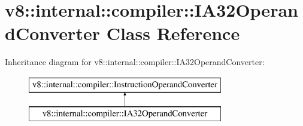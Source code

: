\hypertarget{classv8_1_1internal_1_1compiler_1_1_i_a32_operand_converter}{}\section{v8\+:\+:internal\+:\+:compiler\+:\+:I\+A32\+Operand\+Converter Class Reference}
\label{classv8_1_1internal_1_1compiler_1_1_i_a32_operand_converter}
Inheritance diagram for v8\+:\+:internal\+:\+:compiler\+:\+:I\+A32\+Operand\+Converter\+:\begin{figure}[H]
\begin{center}
\leavevmode
\includegraphics[height=2.000000cm]{classv8_1_1internal_1_1compiler_1_1_i_a32_operand_converter}
\end{center}
\end{figure}
